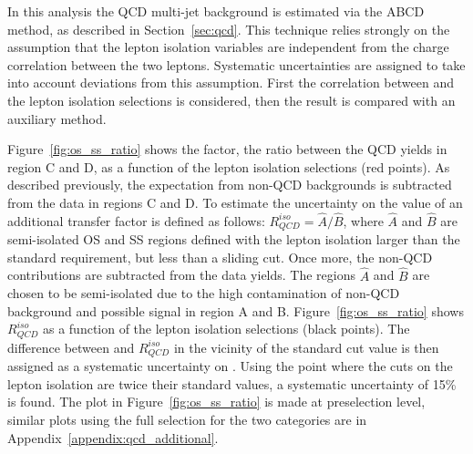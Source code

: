 In this analysis the QCD multi-jet background is estimated via the ABCD method, as
described in Section~\ref{sec:qcd}. This technique relies strongly on
the assumption that the lepton isolation variables are independent from the
charge correlation between the two leptons. Systematic uncertainties
are assigned to take into account deviations from this assumption.
First the correlation between \rqcd and the lepton isolation selections is considered,
then the result is compared with an auxiliary method. 

Figure~\ref{fig:os_ss_ratio} shows the \rqcd factor, the ratio between the QCD 
yields in region C and D, as a function of the lepton isolation selections (red points).
As described previously, the expectation from non-QCD backgrounds is subtracted from the data in regions C and D.
To estimate the uncertainty on the value of \rqcd  an additional transfer factor is defined as follows: $R_{QCD}^{iso}  = \hat{A} / \hat{B}$,
where  $\hat{A}$ and $\hat{B}$  are semi-isolated OS and SS regions defined with the lepton isolation larger than the standard requirement, 
but less than a sliding cut. Once more, the non-QCD contributions are subtracted from the data yields.
The regions $\hat{A}$ and $\hat{B}$ are chosen to be semi-isolated 
due to the high contamination of non-QCD background and possible signal in region A and B. 
Figure~\ref{fig:os_ss_ratio} shows $R_{QCD}^{iso}$ as a function of the lepton isolation selections (black points).
The difference between \rqcd and $R_{QCD}^{iso} $ in the vicinity of the standard cut value is then assigned as a systematic uncertainty on \rqcd. Using the point where the cuts on the lepton isolation are twice their standard values, a systematic uncertainty of 15\% is found.
The plot in Figure~\ref{fig:os_ss_ratio} is made at preselection level, similar plots using the full selection
for the two categories are in Appendix~\ref{appendix:qcd_additional}.



